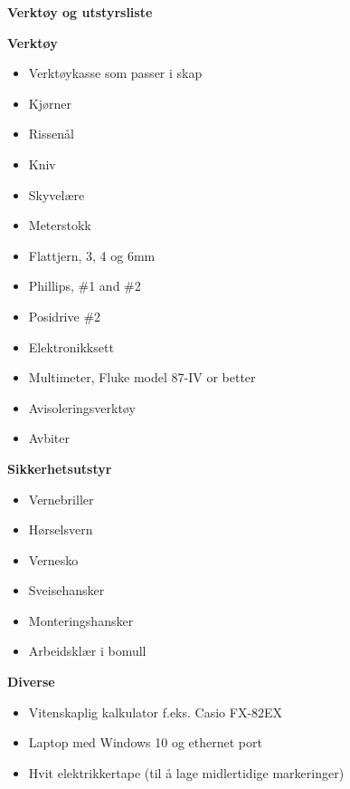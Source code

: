 


\centerline{\bf Verktøy og utstyrsliste }

\vskip 10pt


\noindent
{\bf Verktøy}
\begin{itemize}
	\item Verktøykasse som passer i skap 
	\item Kjørner
	\item Rissenål
	\item Kniv
	\item Skyvelære
	\item Meterstokk
	\item Flattjern, 3, 4 og 6mm
	\item Phillips, \#1 and \#2
	\item Posidrive \#2
	\item Elektronikksett
	\item Multimeter, Fluke model 87-IV or better
	\item Avisoleringsverktøy
	\item Avbiter
\medskip
\end{itemize}
\vskip 10pt

\noindent
{\bf Sikkerhetsutstyr}
\begin{itemize}
	\item Vernebriller
	\item Hørselsvern
	\item Vernesko
	\item Sveisehansker
	\item Monteringshansker
	\item Arbeidsklær i bomull
\medskip
\end{itemize}
\vskip 10pt

\noindent
{\bf Diverse}
\begin{itemize}
	\item Vitenskaplig kalkulator f.eks. Casio FX-82EX
	\item Laptop med Windows 10 og ethernet port
	\item Hvit elektrikkertape (til å lage midlertidige markeringer)
\medskip
\end{itemize}
\vskip 10pt




\vfil

\eject


